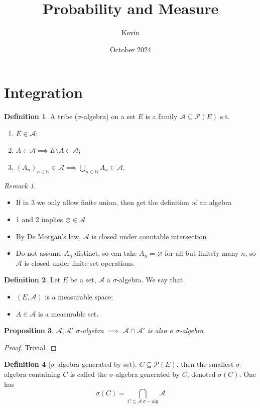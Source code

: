 \documentclass{article}
\title{Probability and Measure}
\author{Kevin}
\date{October 2024}
\theoremstyle{definition}
\newtheorem{defn}{Definition}[section]
\theoremstyle{remark}
\newtheorem{rem}{Remark}
\theoremstyle{plain}
\newtheorem{prop}[defn]{Proposition}
\newcommand{\NN}{\mathbb{N}}
\begin{document}
\maketitle
\section{Integration}
\begin{defn}
    A tribe ($\sigma$-algebra) on a set $E$ is a family $\mathcal{A}\subseteq\mathcal{P}(E)$ s.t.
    \begin{enumerate}
        \item $E\in \mathcal{A}$;
        \item $A\in\mathcal{A}\implies E\setminus A\in\mathcal{A}$;
        \item $(A_n)_{n\in\NN}\in\mathcal{A}\implies\bigcup_{n\in\NN}A_n\in\mathcal{A}$.
    \end{enumerate}
\end{defn}
\begin{rem}
\begin{itemize}
    \item If in 3 we only allow finite union, then get the definition of an algebra
    \item 1 and 2 implies $\varnothing\in\mathcal{A}$
    \item By De Morgan's law, $\mathcal{A}$ is closed under countable intersection
    \item Do not assume $A_n$ distinct, so can take $A_n=\varnothing$ for all but finitely many $n$, so $\mathcal{A}$ is closed under finite set operations.
\end{itemize}   
\end{rem}
\begin{defn}
    Let $E$ be a set, $\mathcal{A}$ a $\sigma$-algebra. We say that
    \begin{itemize}
        \item $(E,\mathcal{A})$ is a measurable space;
        \item $A\in\mathcal{A}$ is a measurable set.
    \end{itemize}
\end{defn}
\begin{prop}
    $\mathcal{A},\mathcal{A}'$ $\sigma$-algebra $\implies$ $\mathcal{A}\cap\mathcal{A}'$ is also a $\sigma$-algebra
\end{prop}
\begin{proof}
Trivial.
\end{proof}
\begin{defn}[$\sigma$-algebra generated by set] $C\subseteq\mathcal{P}(E)$, then the smallest $\sigma$-algebra
 containing $C$ is called the $\sigma$-algebra generated by $C$, denoted $\sigma(C)$. One has
 \[\sigma(C)=\bigcap_{C\subseteq\mathcal{A}\ \sigma-\text{alg}}\mathcal{A}\]
\end{defn}
\end{document}
